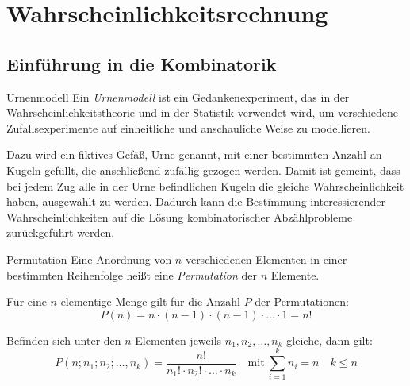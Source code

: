 \section{Wahrscheinlichkeitsrechnung}
\subsection{Einführung in die Kombinatorik}

\begin{bonus}{Urnenmodell}
    Ein \emph{Urnenmodell} ist ein Gedankenexperiment, das in der Wahrscheinlichkeitstheorie und in der Statistik verwendet wird, um verschiedene Zufallsexperimente auf einheitliche und anschauliche Weise zu modellieren.

    Dazu wird ein fiktives Gefäß, Urne genannt, mit einer bestimmten Anzahl an Kugeln gefüllt, die anschließend zufällig gezogen werden.
    Damit ist gemeint, dass bei jedem Zug alle in der Urne befindlichen Kugeln die gleiche Wahrscheinlichkeit haben, ausgewählt zu werden.
    Dadurch kann die Bestimmung interessierender Wahrscheinlichkeiten auf die Lösung kombinatorischer Abzählprobleme zurückgeführt werden.
\end{bonus}

\begin{defi}{Permutation}
    Eine Anordnung von $n$ verschiedenen Elementen in einer bestimmten Reihenfolge heißt eine \emph{Permutation} der $n$ Elemente.

    Für eine $n$-elementige Menge gilt für die Anzahl $P$ der Permutationen:
    \[
        P(n) = n \cdot (n-1) \cdot (n-1) \cdot \ldots \cdot 1 = n!
    \]

    Befinden sich unter den $n$ Elementen jeweils $n_1, n_2, \ldots, n_k$ gleiche, dann gilt:
    \[
        P(n ; n_1 ; n_2 ; \ldots, n_k) = \frac{n!}{n_1! \cdot n_2! \cdot \ldots \cdot n_k} \quad \text{mit} \ \sum_{i=1}^{k} n_i = n \quad k \leq n
    \]
\end{defi}

